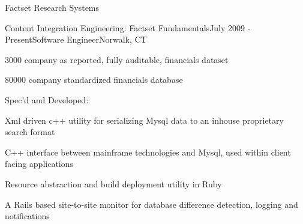 \documentclass{resume} %
\begin{document}
\begin{rSection}{Factset Research Systems}
\begin{rSubsection}{Content Integration Engineering: Factset Fundamentals}{July 2009 - Present}{Software Engineer}{Norwalk, CT}
\item 3000 company as reported, fully auditable, financials dataset
\item 80000 company standardized financials database
\setlength{\itemindent}{2em}
\item Spec'd and Developed:
\setlength{\itemindent}{3em}
\item Xml driven c++ utility for serializing Mysql data to an inhouse proprietary search format
\item C++ interface between mainframe technologies and Mysql, used within client facing applications
\item Resource abstraction and build deployment utility in Ruby
\item A Rails based site-to-site monitor for database difference detection, logging and notifications
\end{rSubsection}

\end{rSection}

\end{document}
